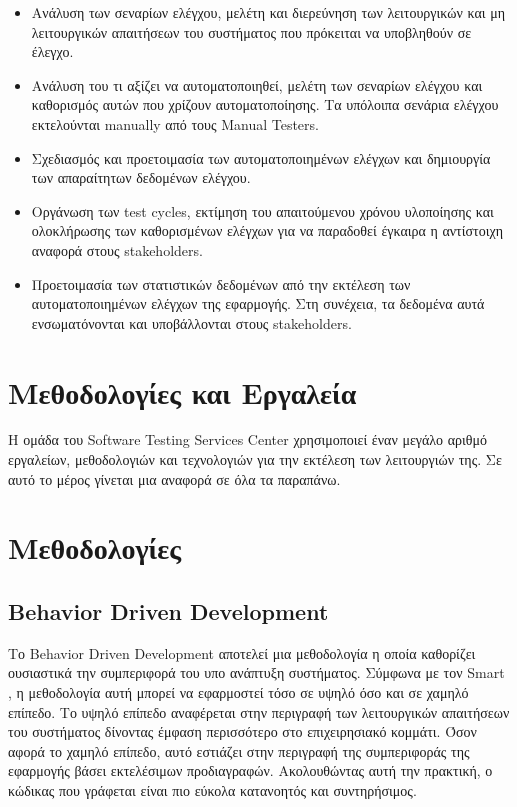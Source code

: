 \begin{itemize}
    \item Ανάλυση των σεναρίων ελέγχου, μελέτη και διερεύνηση των λειτουργικών και μη λειτουργικών απαιτήσεων του συστήματος που πρόκειται να υποβληθούν σε έλεγχο.
    \item Ανάλυση του τι αξίζει να αυτοματοποιηθεί, μελέτη των σεναρίων ελέγχου και καθορισμός αυτών που χρίζουν αυτοματοποίησης. Τα υπόλοιπα σενάρια ελέγχου εκτελούνται manually από τους Manual Testers.
    \item Σχεδιασμός και προετοιμασία των αυτοματοποιημένων ελέγχων και δημιουργία των απαραίτητων δεδομένων ελέγχου.
    \item Οργάνωση των test cycles, εκτίμηση του απαιτούμενου χρόνου υλοποίησης και ολοκλήρωσης των καθορισμένων ελέγχων για να παραδοθεί έγκαιρα η αντίστοιχη αναφορά στους stakeholders.
    \item Προετοιμασία των στατιστικών δεδομένων από την εκτέλεση των αυτοματοποιημένων ελέγχων της εφαρμογής. Στη συνέχεια, τα δεδομένα αυτά ενσωματόνονται και υποβάλλονται στους stakeholders.
\end{itemize}

\section{Μεθοδολογίες και Εργαλεία}

Η ομάδα του Software Testing Services Center χρησιμοποιεί έναν μεγάλο αριθμό εργαλείων, μεθοδολογιών και τεχνολογιών για την εκτέλεση 
των λειτουργιών της. Σε αυτό το μέρος γίνεται μια αναφορά σε όλα τα παραπάνω.

\section*{Μεθοδολογίες}
\subsection*{Behavior Driven Development}
Το Behavior Driven Development αποτελεί μια μεθοδολογία η οποία καθορίζει ουσιαστικά την συμπεριφορά του υπο ανάπτυξη συστήματος. Σύμφωνα με 
τον Smart \cite{bddbook}, η μεθοδολογία αυτή μπορεί να εφαρμοστεί τόσο σε υψηλό όσο και σε χαμηλό επίπεδο. Το υψηλό επίπεδο αναφέρεται στην περιγραφή 
των λειτουργικών απαιτήσεων του συστήματος δίνοντας έμφαση περισσότερο στο επιχειρησιακό κομμάτι. Όσον αφορά το χαμηλό επίπεδο, αυτό εστιάζει 
στην περιγραφή της συμπεριφοράς της εφαρμογής βάσει εκτελέσιμων προδιαγραφών. Ακολουθώντας αυτή την πρακτική, ο κώδικας που γράφεται είναι πιο 
εύκολα κατανοητός και συντηρήσιμος. 

